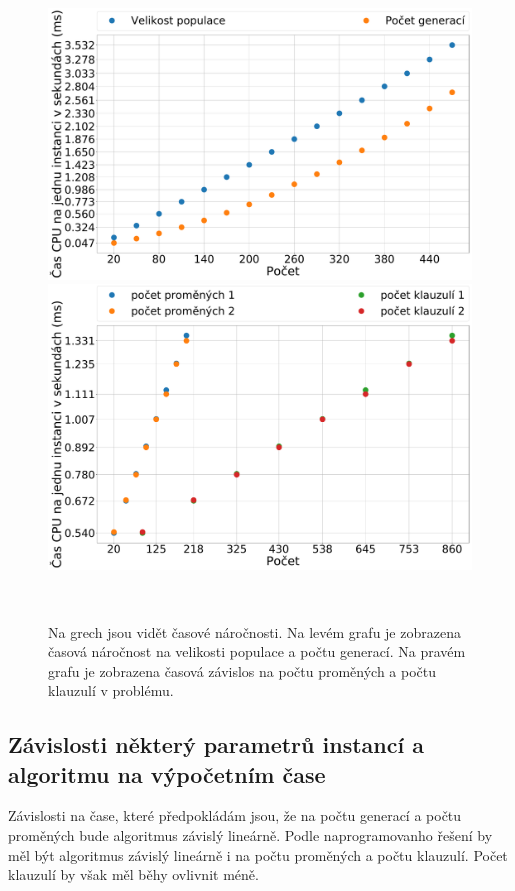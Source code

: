 \documentclass[11pt]{article}
\begin{document}
\begin{figure}
	\centering
    \begin{minipage}[c]{0.48\textwidth}
        \centering\includegraphics[width=\textwidth]{img/time_gen_cnt_sz.pdf} 
    \end{minipage}
    \begin{minipage}[c]{0.48\textwidth}
        \centering \includegraphics[width=\textwidth]{img/time_n_var_cla.pdf} 
    \end{minipage}
    \\
   \caption{Na grech jsou vidět časové náročnosti. Na levém grafu je zobrazena časová náročnost na velikosti populace a počtu generací. Na pravém grafu je zobrazena časová závislos na počtu proměných a počtu klauzulí v problému.}\label{fig:time}
\end{figure} 
\subsection{Závislosti některý parametrů instancí a algoritmu na výpočetním čase}
Závislosti na čase, které předpokládám jsou, že na počtu generací a počtu proměných bude algoritmus závislý lineárně. Podle naprogramovanho řešení by měl být algoritmus závislý lineárně i na počtu proměných a počtu klauzulí. Počet klauzulí by však měl běhy ovlivnit méně. 
\end{document}
